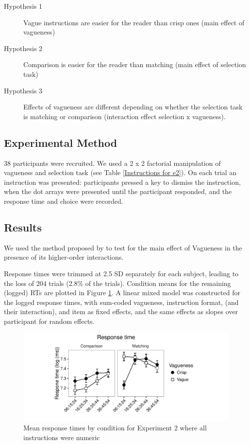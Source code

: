 \begin{description}
	\item [Hypothesis 1] Vague instructions are easier for the reader than crisp ones (main effect of vagueness)
	\item [Hypothesis 2] Comparison is easier for the reader than matching (main effect of selection task)
	\item [Hypothesis 3] Effects of vagueness are different depending on whether the selection task is matching or comparison (interaction effect selection x vagueness).
\end{description}

\subsection{Experimental Method} %

38 participants were recruited. We used a 2 x 2 factorial manipulation of vagueness and selection task (see Table \ref{Instructions for e2}).
On each trial an instruction was presented: participants pressed a key to dismiss the instruction, when the dot arrays were presented until the participant responded, and the response time and choice were recorded.

\subsection{Results} %

We used the method proposed by \citet{Levy:MainEffectsInteractions} to test for the main effect of Vagueness in the presence of its higher-order interactions.

Response times were trimmed at 2.5 SD separately for each subject, leading to the loss of 204 trials (2.8\% of the trials).
Condition means for the remaining (logged) RTs are plotted in Figure \ref{resultse3}.
A linear mixed model was constructed for the logged response times, 
with sum-coded vagueness, instruction format, (and their interaction), and item as fixed effects, and the same effects as slopes over participant for random effects.

\begin{figure}[htbp]
\centering
\includegraphics[width=\textwidth]{figures/e3-rtplot-1.pdf}
\caption{Mean response times by condition for Experiment 2 where all instructions were numeric}
\label{resultse3}
\end{figure}

